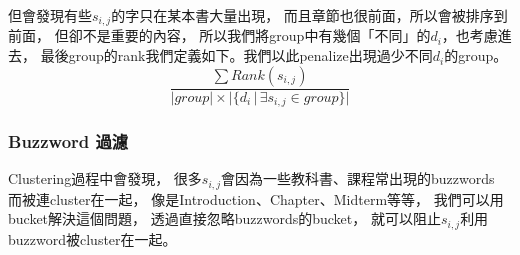 但會發現有些$s_{i,j}$的字只在某本書大量出現，
而且章節也很前面，所以會被排序到前面，
但卻不是重要的內容，
所以我們將group中有幾個「不同」的$d_i$，也考慮進去，
最後group的rank我們定義如下。我們以此penalize出現過少不同$d_i$的group。
\[ \frac
    {\sum \mathit{Rank}(s_{i,j})}
    {|\mathit{group}|\times |\{d_i \,|\, \exists s_{i,j} \in group\}|} \]

\subsubsection{Buzzword 過濾}
Clustering過程中會發現，
很多$s_{i,j}$會因為一些教科書、課程常出現的buzzwords
而被連cluster在一起，
像是Introduction、Chapter、Midterm等等，
我們可以用bucket解決這個問題，
透過直接忽略buzzwords的bucket，
就可以阻止$s_{i,j}$利用buzzword被cluster在一起。
